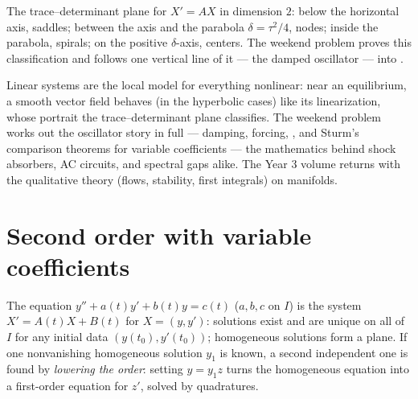 \begin{omfigure}

{\small The trace--determinant plane for $X' = AX$ in dimension
$2$: below the horizontal axis, saddles; between the axis and
the parabola $\delta = \tau^2/4$, nodes; inside the parabola,
spirals; on the positive $\delta$-axis, centers. The weekend
problem proves this classification and follows one vertical
line of it --- the damped oscillator --- into .}
\end{omfigure}

\begin{remark}
Linear systems are the local model for everything nonlinear:
near an equilibrium, a smooth vector field behaves (in the
hyperbolic cases) like its linearization, whose portrait the
trace--determinant plane classifies. The weekend problem works
out the oscillator story in full --- damping, forcing,
, and Sturm's comparison theorems for variable
coefficients --- the mathematics behind shock absorbers, AC
circuits, and spectral gaps alike. The Year 3 volume returns
with the qualitative theory (flows, stability, first
integrals) on manifolds.
\end{remark}

\section{Second order with variable coefficients}

\begin{proposition}\label{prop:b2:diffeq:secondorder}
The equation $y'' + a(t)y' + b(t)y = c(t)$ ($a, b, c$  on
$I$) is the system $X' = A(t)X + B(t)$ for $X = (y, y')$: solutions
exist and are unique on all of $I$ for any initial data $(y(t_0),
y'(t_0))$; homogeneous solutions form a plane. If one nonvanishing
homogeneous solution $y_1$ is known, a second independent one is
found by \emph{lowering the order}: setting $y = y_1 z$ turns the
homogeneous equation into a first-order equation for $z'$, solved
by quadratures.
\end{proposition}

